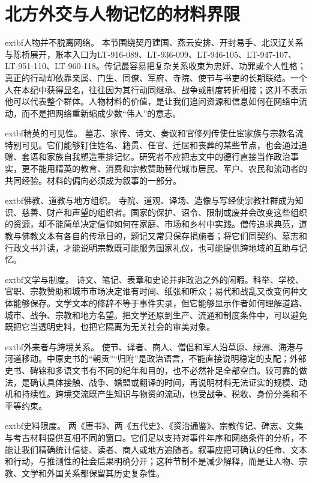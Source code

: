 \section{北方外交与人物记忆的材料界限}
\label{sec:foreign-exchange-biographical-memory}

\noindent	extbf{人物并不脱离网络。} 本节围绕契丹建国、燕云安排、开封易手、北汉辽关系与陈桥展开，账本入口为LT-916-089、LT-936-099、LT-946-105、LT-947-107、LT-951-110、LT-960-118。传记最容易把复杂关系收束为忠奸、功罪或个人性格；真正的行动却依靠亲属、门生、同僚、军府、寺院、使节与书吏的长期联结。一个人在本纪中获得显名，往往因为其行动同继承、战争或制度转折相接；这并不表示他可以代表整个群体。人物材料的价值，是让我们追问资源和信息如何在网络中流动，而不是把网络重新缩成少数“伟人”的意志。

\noindent	extbf{精英的可见性。} 墓志、家传、诗文、奏议和官修列传使仕宦家族与宗教名流特别可见。它们能够钉住姓名、籍贯、任官、迁居和丧葬的某些节点，也会通过追赠、套语和家族自我塑造重排记忆。研究者不应把志文中的德行直接当作政治事实，更不能用精英的教育、消费和宗教赞助替代城市居民、军户、农民和流动者的共同经验。材料的偏向必须成为叙事的一部分。

\noindent	extbf{佛教、道教与地方组织。} 寺院、道观、译场、造像与写经使宗教社群成为知识、慈善、财产和声望的组织者。国家的保护、诏令、限制或废并会改变这些组织的资源，却不能简单决定信仰如何在家庭、市场和乡村中实践。僧传追求典范，道教与佛教文本有各自的传承目的，题记又常只保存捐施者；将它们同契约、墓志和行政文书并读，才能说明宗教既可能服务国家礼仪，也可能提供跨地域的互助与记忆。

\noindent	extbf{文学与制度。} 诗文、笔记、表章和史论并非政治之外的闲暇。科举、学校、官职、宗教赞助和城市市场决定谁有时间、纸张和听众；易代和战乱又改变何种文体能够保存。文学文本的修辞不等于事件实录，但它能够显示作者如何理解道路、城市、战争、宗教和地方名望。把文学还原到生产、流通和制度条件中，可以避免既把它当透明史料，也把它隔离为无关社会的审美对象。

\noindent	extbf{外来者与跨境关系。} 使节、译者、商人、僧侣和军人沿草原、绿洲、海港与河道移动。中原史书的“朝贡”“归附”是政治语言，不能直接说明稳定的支配；外部史书、碑铭和多语文书有不同的纪年和目的，也不必然补足全部空白。较可靠的做法，是确认具体接触、战争、婚盟或翻译的时间，再说明材料无法证实的规模、动机和持续性。跨境交流既产生知识与物资的流动，也受战争、税收、身份分类和不平等约束。

\noindent	extbf{史料限度。} 两《唐书》、两《五代史》、《资治通鉴》、宗教传记、碑志、文集与考古材料提供互相不同的窗口。它们足以支持对事件年序和网络条件的分析，不能让我们精确统计信徒、读者、商人或地方追随者。叙事应把可确认的任命、文本和行动，与推测性的社会后果明确分开；这种节制不是减少解释，而是让人物、宗教、文学和外国关系都保留其历史复杂性。

